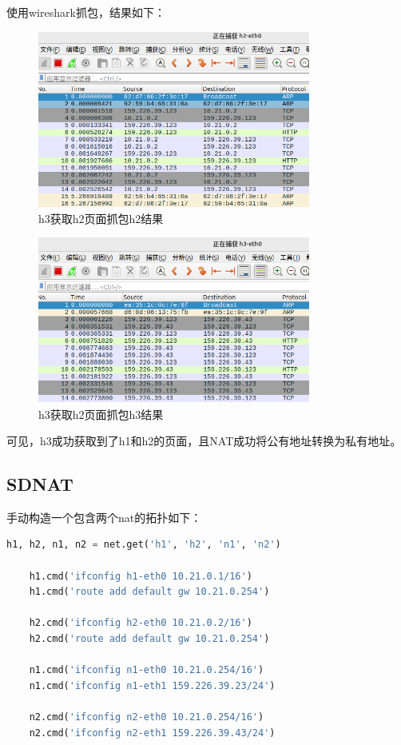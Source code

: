 \documentclass[UTF8]{report}
\begin{document}
使用wireshark抓包，结果如下：

\begin{figure}[H]
    \centering
    \includegraphics[width=0.8\textwidth]{dnat_ws_h2.png}
    \caption{h3获取h2页面抓包h2结果}
\end{figure}

\begin{figure}[H]
    \centering
    \includegraphics[width=0.8\textwidth]{dnat_ws_h3.png}
    \caption{h3获取h2页面抓包h3结果}
\end{figure}

可见，h3成功获取到了h1和h2的页面，且NAT成功将公有地址转换为私有地址。

\subsection{SDNAT}

手动构造一个包含两个nat的拓扑如下：

\begin{lstlisting}[language=Python]
    h1, h2, n1, n2 = net.get('h1', 'h2', 'n1', 'n2')

    h1.cmd('ifconfig h1-eth0 10.21.0.1/16')
    h1.cmd('route add default gw 10.21.0.254')

    h2.cmd('ifconfig h2-eth0 10.21.0.2/16')
    h2.cmd('route add default gw 10.21.0.254')

    n1.cmd('ifconfig n1-eth0 10.21.0.254/16')
    n1.cmd('ifconfig n1-eth1 159.226.39.23/24')

    n2.cmd('ifconfig n2-eth0 10.21.0.254/16')
    n2.cmd('ifconfig n2-eth1 159.226.39.43/24')
\end{lstlisting}
\end{document}
